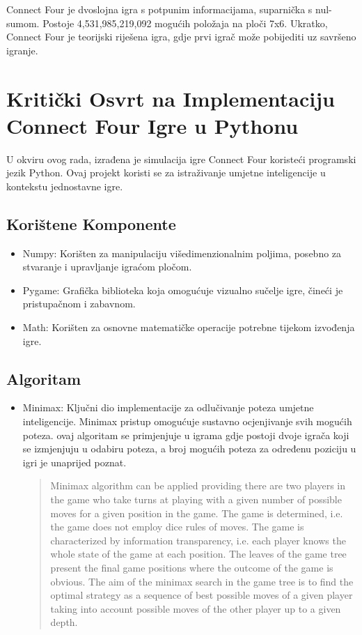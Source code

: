 \documentclass[]{foi}
\begin{document}
Connect Four je dvoslojna igra s potpunim informacijama, suparnička s nul-sumom. Postoje 4,531,985,219,092 mogućih položaja na ploči 7x6.
Ukratko, Connect Four je teorijski riješena igra, gdje prvi igrač može pobijediti uz savršeno igranje.






\chapter{Kritički Osvrt na Implementaciju Connect Four Igre u Pythonu}

U okviru ovog rada, izrađena je simulacija igre Connect Four koristeći programski jezik Python. Ovaj projekt koristi se za istraživanje umjetne inteligencije u kontekstu jednostavne igre.

\section{Korištene Komponente}
\begin{itemize}
    
    \item Numpy: Korišten za manipulaciju višedimenzionalnim poljima, posebno za stvaranje i upravljanje igraćom pločom.
    \item Pygame: Grafička biblioteka koja omogućuje vizualno sučelje igre, čineći je pristupačnom i zabavnom.
    \item Math: Korišten za osnovne matematičke operacije potrebne tijekom izvođenja igre.
\end{itemize}
\section{Algoritam}
\begin{itemize}
    \item Minimax: Ključni dio implementacije za odlučivanje poteza umjetne inteligencije. Minimax pristup omogućuje sustavno ocjenjivanje svih mogućih poteza. ovaj algoritam se primjenjuje u igrama gdje postoji dvoje igrača koji se izmjenjuju u odabiru poteza, a broj mogućih poteza za određenu poziciju u igri je unaprijed poznat.


 \blockquote[{\cite[str. 2]{borovska2007efficiency}}]{Minimax algorithm can be applied providing there are two players in the game who
take turns at playing with a given number of possible moves for a given position in the
game. The game is determined, i.e. the game does not employ dice rules of moves. The
game is characterized by information transparency, i.e. each player knows the whole state
of the game at each position. The leaves of the game tree present the final game positions
where the outcome of the game is obvious. The aim of the minimax search in the game
tree is to find the optimal strategy as a sequence of best possible moves of a given player
taking into account possible moves of the other player up to a given depth.}

\end{itemize}
\end{document}
